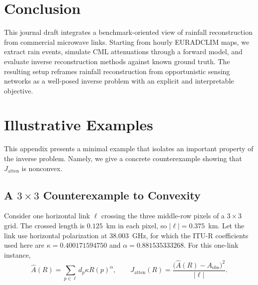 \documentclass[a4paper,fleqn]{cas-sc}
\begin{document}
\section{Conclusion}
This journal draft integrates a benchmark-oriented view of rainfall reconstruction from commercial microwave links. Starting from hourly EURADCLIM maps, we extract rain events, simulate CML attenuations through a forward model, and evaluate inverse reconstruction methods against known ground truth. The resulting setup reframes rainfall reconstruction from opportunistic sensing networks as a well-posed inverse problem with an explicit and interpretable objective.



\appendix
{}

\section{Illustrative Examples}

This appendix presents a minimal example that isolates an important property of the inverse problem. Namely, we give a concrete counterexample showing that $J_{\text{atten}}$ is nonconvex.

\subsection{A $3\times3$ Counterexample to Convexity}
\label{appendix:nonconvexity-example}
Consider one horizontal link $\ell$ crossing the three middle-row pixels of a
$3\times3$ grid.  The crossed length is $0.125$~km in each pixel, so
$|\ell|=0.375$~km.  Let the link use horizontal polarization at
$38.003$~GHz, for which the ITU-R coefficients used here are
$\kappa=0.400171594750$ and $\alpha=0.881535333268$.  For this one-link
instance,
\[
\widehat A(R)=\sum_{p\in\ell}d_p\kappa R(p)^\alpha,
\qquad
J_{\mathrm{atten}}(R)=
\frac{\bigl(\widehat A(R)-A_{\mathrm{obs}}\bigr)^2}{|\ell|}.
\]
\end{document}
